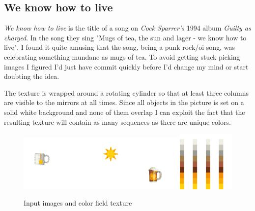 \documentclass{article}
\begin{document}
\pagebreak

\subsection{We know how to live}

\emph{We know how to live} is the title of a song on \emph{Cock
Sparrer's} 1994 album \emph{Guilty as charged}. In the song they sing
"Mugs of tea, the sun and lager - we know how to live". I found it quite
amusing that the song, being a punk rock/oi song, was celebrating
something mundane as mugs of tea. To avoid getting stuck picking images
I figured I'd just have commit quickly before I'd change my mind or
start doubting the idea.

The texture is wrapped around a rotating cylinder so that at least three
columns are visible to the mirrors at all times. Since all objects in
the picture is set on a solid white background and none of them overlap
I can exploit the fact that the resulting texture will contain as many
sequences as there are unique colors. 

\begin{figure}[ht!]

\centering
\includegraphics[width=0.25\textwidth]{images/tea-sun-lager/input_0.png}\includegraphics[width=0.25\textwidth]{images/tea-sun-lager/input_1.png}\includegraphics[width=0.25\textwidth]{images/tea-sun-lager/input_2.png}\includegraphics[width=0.25\textwidth]{images/tea-sun-lager/texture.png}
\caption{Input images and color field texture}
\end{figure}
\end{document}
